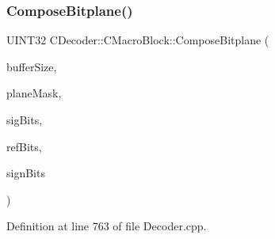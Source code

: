 \subsubsection{\texorpdfstring{ComposeBitplane()}{ComposeBitplane()}}
{\footnotesize\ttfamily U\+I\+N\+T32 C\+Decoder\+::\+C\+Macro\+Block\+::\+Compose\+Bitplane (\begin{DoxyParamCaption}\item[{U\+I\+N\+T32}]{buffer\+Size,  }\item[{\mbox{\hyperlink{PGFtypes_8h_acb1ee3f52ccfad782dcaa0abd79e5d05}{DataT}}}]{plane\+Mask,  }\item[{U\+I\+N\+T32 $\ast$}]{sig\+Bits,  }\item[{U\+I\+N\+T32 $\ast$}]{ref\+Bits,  }\item[{U\+I\+N\+T32 $\ast$}]{sign\+Bits }\end{DoxyParamCaption})\hspace{0.3cm}{\ttfamily [private]}}



Definition at line 763 of file Decoder.\+cpp.


